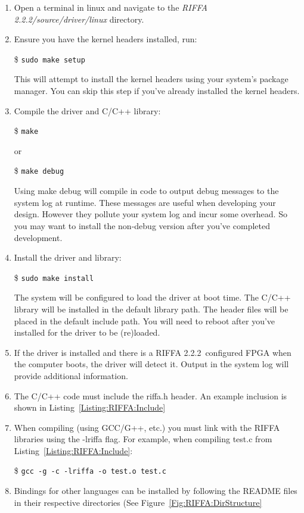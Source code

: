 \documentclass{refrep}
\newcommand{\RIFFAVer}{2.2.2}
\newcommand{\Directory}[1]{\textit{#1}}
\newcommand{\TermCmd}[1]{\$ \texttt{#1}}
\begin{document}
\begin{enumerate}
\item Open a terminal in linux and navigate to the \Directory{RIFFA \RIFFAVer/source/driver/linux} directory.
\item Ensure you have the kernel headers installed, run:

  \TermCmd{sudo make setup}

  This will attempt to install the kernel headers using your system's package
  manager. You can skip this step if you've already installed the kernel headers.
\item Compile the driver and C/C++ library:

  \TermCmd{make}

  or

  \TermCmd{make debug}

  Using make debug will compile in code to output debug messages to the system log
  at runtime. These messages are useful when developing your design. However they
  pollute your system log and incur some overhead. So you may want to install the
  non-debug version after you've completed development.
\item Install the driver and library:

  \TermCmd{sudo make install}

  The system will be configured to load the driver at boot time. The C/C++ library
  will be installed in the default library path. The header files will be placed
  in the default include path. You will need to reboot after you've installed for
  the driver to be (re)loaded. 
\item If the driver is installed and there is a RIFFA \RIFFAVer~configured FPGA when the computer boots, the
  driver will detect it. Output in the system log will provide additional
  information. 
\item The C/C++ code must include the riffa.h header. An example inclusion is
  shown in Listing~\ref{Listing:RIFFA:Include}
\item When compiling (using GCC/G++, etc.) you must link with the RIFFA
  libraries using the -lriffa flag. For example, when compiling test.c from
  Listing~\ref{Listing:RIFFA:Include}:

  \TermCmd{gcc -g -c -lriffa -o test.o test.c}
\item Bindings for other languages can be installed by following the README
  files in their respective directories (See Figure~\ref{Fig:RIFFA:DirStructure}
\end{enumerate}
\end{document}
